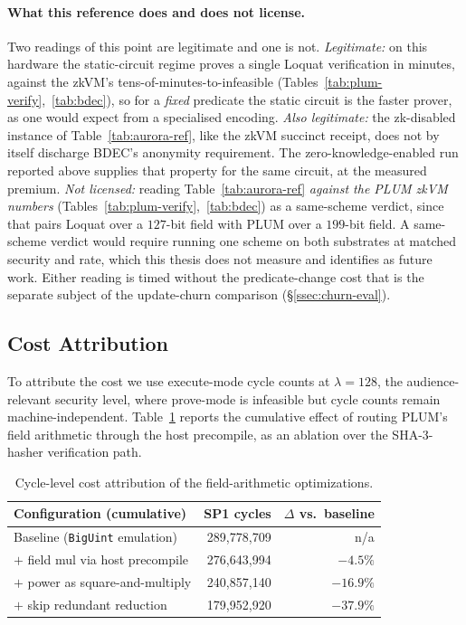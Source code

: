\paragraph{What this reference does and does not license.}
Two readings of this point are legitimate and one is not. \emph{Legitimate:} on this hardware the static-circuit regime proves a single Loquat verification in minutes, against the zkVM's tens-of-minutes-to-infeasible (Tables~\ref{tab:plum-verify},~\ref{tab:bdec}), so for a \emph{fixed} predicate the static circuit is the faster prover, as one would expect from a specialised encoding. \emph{Also legitimate:} the zk-disabled instance of Table~\ref{tab:aurora-ref}, like the zkVM succinct receipt, does not by itself discharge BDEC's anonymity requirement. The zero-knowledge-enabled run reported above supplies that property for the same circuit, at the measured premium. \emph{Not licensed:} reading Table~\ref{tab:aurora-ref} \emph{against the PLUM zkVM numbers} (Tables~\ref{tab:plum-verify},~\ref{tab:bdec}) as a same-scheme verdict, since that pairs Loquat over a $127$-bit field with PLUM over a $199$-bit field. A same-scheme verdict would require running one scheme on both substrates at matched security and rate, which this thesis does not measure and identifies as future work. Either reading is timed without the predicate-change cost that is the separate subject of the update-churn comparison (\S\ref{ssec:churn-eval}).

\subsection{Cost Attribution}\label{ssec:attribution}
To attribute the cost we use execute-mode cycle counts at $\lambda=128$, the audience-relevant security level, where prove-mode is infeasible but cycle counts remain machine-independent. Table~\ref{tab:ablation} reports the cumulative effect of routing PLUM's field arithmetic through the host precompile, as an ablation over the SHA-3-hasher verification path.

\begin{table}[H]
\centering
\small
\begin{tabular}{lrr}
\toprule
Configuration (cumulative) & SP1 cycles & $\Delta$ vs.\ baseline \\
\midrule
Baseline (\texttt{BigUint} emulation)        & 289{,}778{,}709 & n/a \\
$+$ field mul via host precompile            & 276{,}643{,}994 & $-4.5\%$ \\
$+$ power as square-and-multiply             & 240{,}857{,}140 & $-16.9\%$ \\
$+$ skip redundant reduction                 & 179{,}952{,}920 & $-37.9\%$ \\
\bottomrule
\end{tabular}
\caption{Cycle-level cost attribution of the field-arithmetic optimizations.}
\label{tab:ablation}
\end{table}

